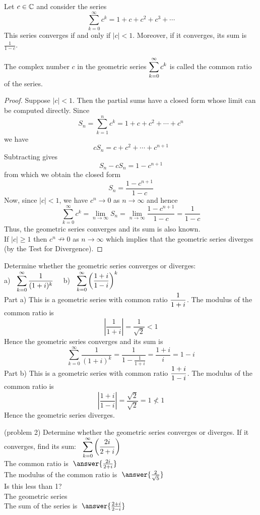 \documentclass[handout]{ximera}
\begin{document}
\begin{theorem}
Let $c \in \mathbb C$ and consider the series
\[
\sum_{k=0}^\infty c^k = 1 + c + c^2 + c^3 + \cdots
\]
This series converges if and only if $|c| < 1$.  Moreover, if it converges, its sum is 
$\displaystyle \frac{1}{1-c}$.
\end{theorem}

\begin{remark}
The complex number $c$ in the geometric series $\displaystyle \sum_{k=0}^\infty c^k$ is called the common ratio of the series.
\end{remark}

\begin{proof}
Suppose $|c| < 1$. Then the partial sums have a closed form whose limit can be computed directly.
Since
\[
S_n = \sum_{k=1}^n c^k = 1+c+c^2+\cdots + c^n
\]
we have
\[
cS_n = c+c^2+\cdots + c^{n+1}
\]
Subtracting gives
\[
S_n - cS_n = 1-c^{n+1}
\]
from which we obtain the closed form
\[
S_n = \frac{1-c^{n+1}}{1-c}
\]
Now, since $|c|<1$, we have $c^n \to 0$ as $n \to \infty$ and hence
\[
\sum_{k=0}^\infty c^k = \lim_{n\to \infty} S_n = \lim_{n\to \infty} \frac{1-c^{n+1}}{1-c} = \frac{1}{1-c}
\]
Thus, the geometric series converges and its sum is also known.\\
If $|c| \geq 1$ then $c^n \nrightarrow 0$ as $n \to \infty$ which implies 
that the geometric series diverges (by the Test for Divergence).
\end{proof}


\begin{example}[example 2] 
Determine whether the geometric series converges or diverges:\\
a) $\;\;\displaystyle \sum_{k=0}^\infty \frac{1}{(1+i)^k}\quad$  b) $\;\;\displaystyle \sum_{k=0}^\infty \left(\frac{1+i}{1-i}\right)^k$ \\
Part a) This is a geometric series with common ratio $\displaystyle \frac{1}{1+i}$. The modulus of the common ratio is 
\[
\left|\frac{1}{1+i}\right| = \frac{1}{\sqrt 2} <1
\]
Hence the geometric series converges and its sum is
\[
\sum_{k=0}^\infty \frac{1}{(1+i)^k} = \frac{1}{1-\frac{1}{1+i}} = \frac{1+i}{i} = 1-i
\]
Part b) This is a geometric series with common ratio $\displaystyle \frac{1+i}{1-i}$. The modulus of the common ratio is 
\[
\left|\frac{1+i}{1-i}\right| = \frac{\sqrt 2}{\sqrt 2} = 1 \nless 1
\]
Hence the geometric series diverges.
\end{example}


\begin{problem}(problem 2)
Determine whether the geometric series converges or diverges. If it converges, find its sum: $\;\;\displaystyle \sum_{k=0}^\infty \left(\frac{2i}{2+i}\right)$ \\
The common ratio is $\; \answer{\frac{2i}{2+i}}$\\
The modulus of the common ratio is $\; \answer{\frac{2}{\sqrt 5}}$\\
Is this less than 1? \\
The geometric series  \\
The sum of the series is $\; \answer{\frac{2+i}{2-i}}$
\end{problem}
\end{document}
